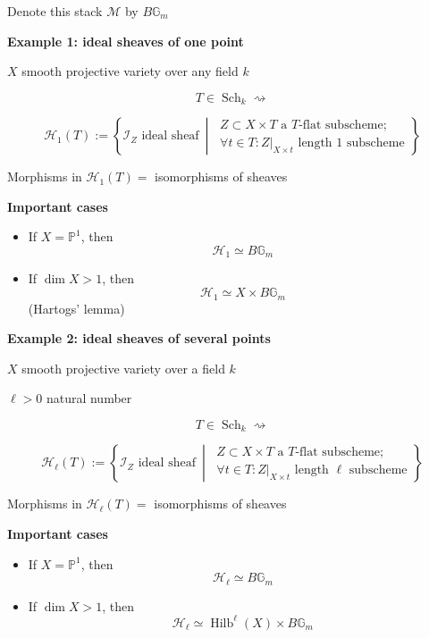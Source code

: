 Denote this stack $\mathcal M$ by
$B\mathbb G_m$

\medskip\noindent
{\bf Example 1: ideal sheaves of one
point}

$X$ smooth projective variety over any
field $k$

$$
T\in\operatorname{Sch}_k
\rightsquigarrow
$$

$$
\mathcal H_1(T)
:=
\left\{
\mathcal I_Z\text{ ideal sheaf}
\ \middle|\
\begin{array}{l}
Z\subset X\times T
\text{ a }T\text{-flat subscheme};\\
\forall t\in T:
Z|_{X\times t}
\text{ length }1\text{ subscheme}
\end{array}
\right\}
$$

Morphisms in $\mathcal H_1(T)=$
isomorphisms of sheaves

\medskip\noindent
{\bf Important cases}

\begin{itemize}
\item If $X=\mathbb P^1$, then
$$
\mathcal H_1\simeq B\mathbb G_m
$$

\item If $\dim X>1$, then
$$
\mathcal H_1
\simeq
X\times B\mathbb G_m
$$
(Hartogs' lemma)
\end{itemize}

\medskip\noindent
{\bf Example 2: ideal sheaves of several
points}

$X$ smooth projective variety over a
field $k$

$\ell>0$ natural number

$$
T\in\operatorname{Sch}_k
\rightsquigarrow
$$

$$
\mathcal H_\ell(T)
:=
\left\{
\mathcal I_Z\text{ ideal sheaf}
\ \middle|\
\begin{array}{l}
Z\subset X\times T
\text{ a }T\text{-flat subscheme};\\
\forall t\in T:
Z|_{X\times t}
\text{ length }\ell\text{ subscheme}
\end{array}
\right\}
$$

Morphisms in $\mathcal H_\ell(T)=$
isomorphisms of sheaves

\medskip\noindent
{\bf Important cases}

\begin{itemize}
\item If $X=\mathbb P^1$, then
$$
\mathcal H_\ell\simeq B\mathbb G_m
$$

\item If $\dim X>1$, then
$$
\mathcal H_\ell
\simeq
\operatorname{Hilb}^{\ell}(X)
\times B\mathbb G_m
$$
\end{itemize}

